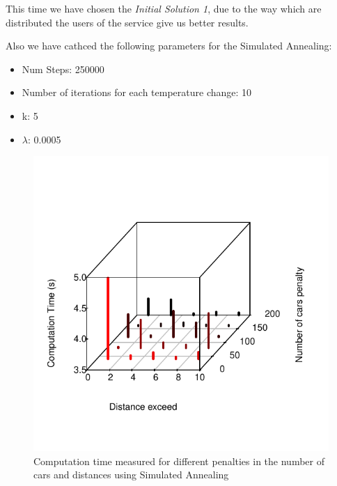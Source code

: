 \documentclass[12]{article}
\begin{document}
This time we have chosen the \emph{Initial Solution 1}, due to the way which are distributed the users of the service give us better results.

Also we have cathced the following parameters for the Simulated Annealing:

\begin{itemize}
  \item Num Steps: 250000
  \item Number of iterations for each temperature change: 10
  \item k: 5
  \item $\lambda$: 0.0005
\end{itemize}


\begin{figure}[H]
  \captionsetup{justification=centering}
   \centering
    \includegraphics[scale=0.8]{Results/data_6_1.pdf}
      \caption{Computation time measured for different penalties in the number of cars and distances using Simulated Annealing}
      \label{fig:data_6_1}
  \end{figure}
    \vspace{1cm}
\end{document}
